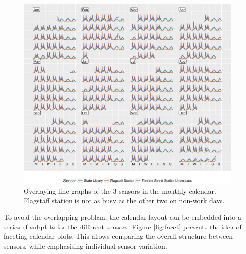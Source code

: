 \documentclass[article]{jss}
\theoremstyle{definition}
\theoremstyle{definition}
\theoremstyle{definition}
\theoremstyle{remark}
\begin{document}
\begin{CodeChunk}
\begin{figure}

{\centering \includegraphics[width=\textwidth]{figure/overlay-1} 

}

\caption[Overlaying line graphs of the 3 sensors in the monthly
calendar. Flagstaff station is not as busy as the other two on non-work
days.]{Overlaying line graphs of the 3 sensors in the monthly
calendar. Flagstaff station is not as busy as the other two on non-work
days.}\label{fig:overlay}
\end{figure}
\end{CodeChunk}





To avoid the overlapping problem, the calendar layout can be embedded
into a series of subplots for the different sensors. Figure
\ref{fig:facet} presents the idea of faceting calendar plots. This
allows comparing the overall structure between sensors, while
emphasising individual sensor variation.
\end{document}
